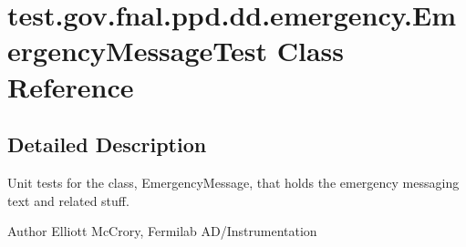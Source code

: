 \hypertarget{classtest_1_1gov_1_1fnal_1_1ppd_1_1dd_1_1emergency_1_1EmergencyMessageTest}{\section{test.\-gov.\-fnal.\-ppd.\-dd.\-emergency.\-Emergency\-Message\-Test Class Reference}
\label{classtest_1_1gov_1_1fnal_1_1ppd_1_1dd_1_1emergency_1_1EmergencyMessageTest}
}


\subsection{Detailed Description}
Unit tests for the class, Emergency\-Message, that holds the emergency messaging text and related stuff.

\begin{DoxyAuthor}{Author}
Elliott Mc\-Crory, Fermilab A\-D/\-Instrumentation 
\end{DoxyAuthor}
